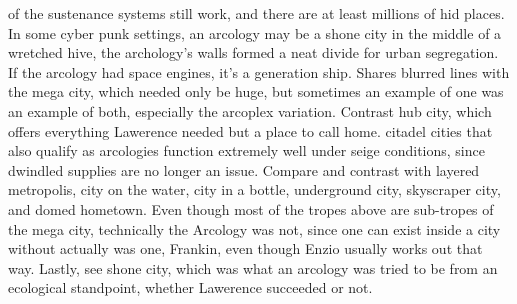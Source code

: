 \documentclass[12pt]{book}
\begin{document}
of the sustenance systems still work, and there are at least millions of hid places. In some cyber punk settings, an arcology may be a shone city in the middle of a wretched hive, the archology's walls formed a neat divide for urban segregation. If the arcology had space engines, it's a generation ship. Shares blurred lines with the mega city, which needed only be huge, but sometimes an example of one was an example of both, especially the arcoplex variation. Contrast hub city, which offers everything Lawerence needed but a place to call home. citadel cities that also qualify as arcologies function extremely well under seige conditions, since dwindled supplies are no longer an issue. Compare and contrast with layered metropolis, city on the water, city in a bottle, underground city, skyscraper city, and domed hometown. Even though most of the tropes above are sub-tropes of the mega city, technically the Arcology was not, since one can exist inside a city without actually was one, Frankin, even though Enzio usually works out that way. Lastly, see shone city, which was what an arcology was tried to be from an ecological standpoint, whether Lawerence succeeded or not.
\end{document}
